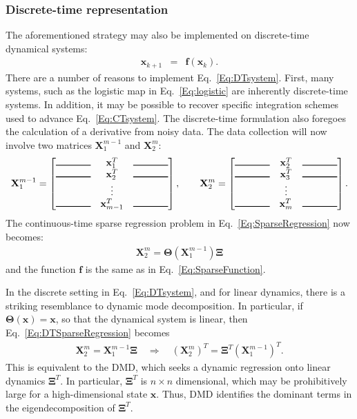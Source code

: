 \documentclass[onecolumn,11pt]{article}
\newcommand{\bx}{\mathbf{x}}
\newcommand{\bX}{\mathbf{X}}
\newcommand{\bXi}{\boldsymbol{\Xi}}
\newcommand{\bTheta}{\boldsymbol{\Theta}}
\begin{document}
\subsubsection{Discrete-time representation}
The aforementioned strategy may also be implemented on discrete-time dynamical systems:
\begin{eqnarray}
\bx_{k+1} &= &\mathbf{f}(\bx_k).
\label{Eq:DTsystem}
\end{eqnarray}
There are a number of reasons to implement Eq.~\eqref{Eq:DTsystem}.  First, many systems, such as the logistic map in Eq.~\eqref{Eq:logistic} are inherently discrete-time systems.  In addition, it may be possible to recover specific integration schemes used to advance Eq.~\eqref{Eq:CTsystem}.  The discrete-time formulation also foregoes the calculation of a derivative from noisy data.  The data collection will now involve two matrices $\bX_1^{m-1}$ and $\bX_2^m$:
\begin{eqnarray}
\bX_1^{m-1}=
\begin{bmatrix}\rule{.5in}{.75pt} & \bx_1^T &\rule{.5in}{.75pt} \\ 
\rule{.5in}{.75pt} & \bx_2^T &\rule{.5in}{.75pt} \\ 
& \vdots &  \\ 
\rule{.5in}{.75pt} & \bx_{m-1}^T &\rule{.5in}{.75pt}
\end{bmatrix}, \quad\quad
\bX_2^{m}=
\begin{bmatrix}\rule{.5in}{.75pt} & \bx_2^T &\rule{.5in}{.75pt} \\ 
\rule{.5in}{.75pt} & \bx_3^T &\rule{.5in}{.75pt} \\ 
& \vdots &  \\ 
\rule{.5in}{.75pt} & \bx_{m}^T &\rule{.5in}{.75pt}
\end{bmatrix}.
\end{eqnarray}
The continuous-time sparse regression problem in Eq.~\eqref{Eq:SparseRegression} now becomes:
\begin{eqnarray}
\bX_2^m = \bTheta(\bX_1^{m-1}) \bXi\label{Eq:DTSparseRegression}
\end{eqnarray}
and the function $\mathbf{f}$ is the same as in Eq.~\eqref{Eq:SparseFunction}.

In the discrete setting in Eq.~\eqref{Eq:DTsystem}, and for linear dynamics, there is a striking resemblance to dynamic mode decomposition.  In particular, if $\bTheta(\bx)=\bx$, so that the dynamical system is linear, then Eq.~\eqref{Eq:DTSparseRegression} becomes 
\begin{eqnarray}
\bX_2^m=\bX_1^{m-1}\bXi \quad\Longrightarrow \quad \left(\bX_2^m\right)^T=\bXi^T\left(\bX_1^{m-1}\right)^T.
\end{eqnarray} 
This is equivalent to the DMD, which seeks a dynamic regression onto linear dynamics $\bXi^T$.  In particular, $\bXi^T$ is $n\times n$ dimensional, which may be prohibitively large for a high-dimensional state $\bx$.  Thus, DMD identifies the dominant terms in the eigendecomposition of $\bXi^T$.
\end{document}
